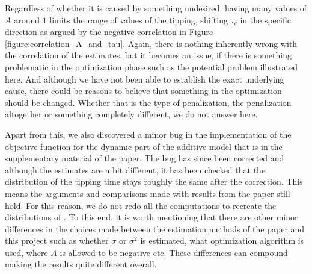 Regardless of whether it is caused by something undesired, having many values of $A$ around $1$ limits the range of values of the tipping, shifting $\tau_c$ in the specific direction as argued by the negative correlation in Figure \ref{figure:correlation_A_and_tau}. Again, there is nothing inherently wrong with the correlation of the estimates, but it becomes an issue, if there is something problematic in the optimization phase such as the potential problem illustrated here. And although we have not been able to establish the exact underlying cause, there could be reasons to believe that something in the optimization should be changed. Whether that is the type of penalization, the penalization altogether or something completely different, we do not answer here.

Apart from this, we also discovered a minor bug in the implementation of the objective function for the dynamic part of the additive model that is in the supplementary material of the paper. The bug has since been corrected and although the estimates are a bit different, it has been checked that the distribution of the tipping time stays roughly the same after the correction. This means the arguments and comparisons made with results from the paper still hold. For this reason, we do not redo all the computations to recreate the distributions of \cite{Ditlevsen2023}. To this end, it is worth mentioning that there are other minor differences in the choices made between the estimation methods of the paper and this project such as whether $\sigma$ or $\sigma^2$ is estimated, what optimization algorithm is used, where $A$ is allowed to be negative etc.
These differences can compound making the results quite different overall. 

